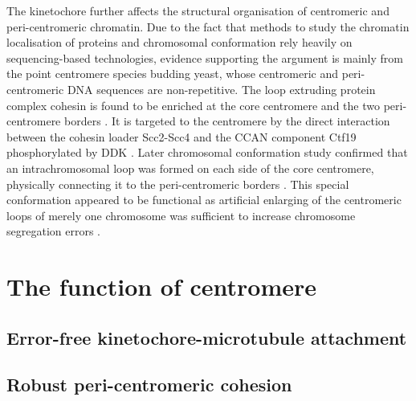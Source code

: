 The kinetochore further affects the structural organisation of centromeric and peri-centromeric chromatin. Due to the fact that methods to study the chromatin localisation of proteins and chromosomal conformation rely heavily on sequencing-based technologies, evidence supporting the argument is mainly from the point centromere species budding yeast, whose centromeric and peri-centromeric DNA sequences are non-repetitive. The loop extruding protein complex cohesin is found to be enriched at the core centromere and the two peri-centromere borders \citep{Eckert2007TheTension, Fernius2009EstablishmentCsm3, Fernius2013Cohesin-DependentEstablishment, Glynn2004Genome-WideCerevisiae, Weber2004TheBinding}. It is targeted to the centromere by the direct interaction between the cohesin loader Scc2-Scc4 and the CCAN component Ctf19 phosphorylated by DDK \citep{Hinshaw2015StructuralLoading, Hinshaw2017TheComplex}. Later chromosomal conformation study confirmed that an intrachromosomal loop was formed on each side of the core centromere, physically connecting it to the peri-centromeric borders \citep{Paldi2020ConvergentPericentromeres}. This special conformation appeared to be functional as artificial enlarging of the centromeric loops of merely one chromosome was sufficient to increase chromosome segregation errors \citep{Paldi2020ConvergentPericentromeres}. 


\section{The function of centromere}
\subsection{Error-free kinetochore-microtubule attachment}
\subsection{Robust peri-centromeric cohesion}
